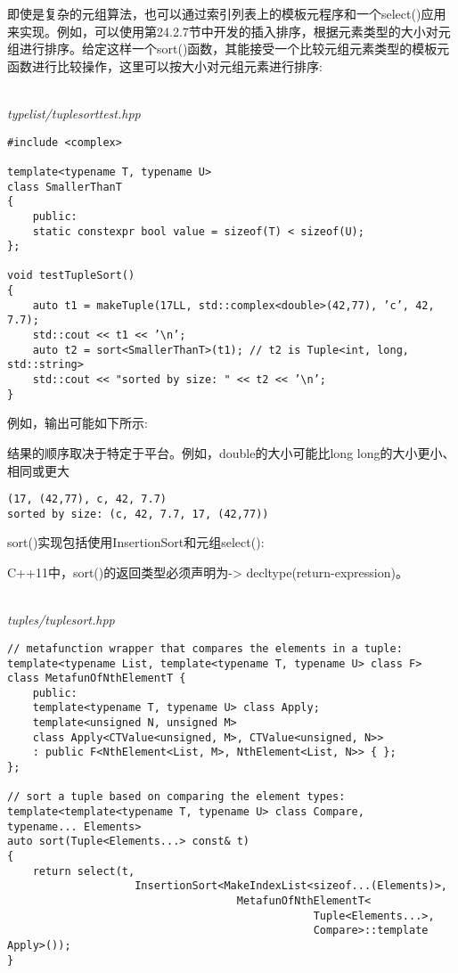 即使是复杂的元组算法，也可以通过索引列表上的模板元程序和一个select()应用来实现。例如，可以使用第24.2.7节中开发的插入排序，根据元素类型的大小对元组进行排序。给定这样一个sort()函数，其能接受一个比较元组元素类型的模板元函数进行比较操作，这里可以按大小对元组元素进行排序:

\hspace*{\fill} \\ %
\noindent
\textit{typelist/tuplesorttest.hpp}
\begin{lstlisting}[style=styleCXX]
#include <complex>

template<typename T, typename U>
class SmallerThanT
{
	public:
	static constexpr bool value = sizeof(T) < sizeof(U);
};

void testTupleSort()
{
	auto t1 = makeTuple(17LL, std::complex<double>(42,77), ’c’, 42, 7.7);
	std::cout << t1 << ’\n’;
	auto t2 = sort<SmallerThanT>(t1); // t2 is Tuple<int, long, std::string>
	std::cout << "sorted by size: " << t2 << ’\n’;
}
\end{lstlisting}

例如，输出可能如下所示:

\begin{tcolorbox}[colback=webgreen!5!white,colframe=webgreen!75!black]
\hspace*{0.75cm}结果的顺序取决于特定于平台。例如，double的大小可能比long long的大小更小、相同或更大
\end{tcolorbox}

\begin{lstlisting}[style=styleCXX]
(17, (42,77), c, 42, 7.7)
sorted by size: (c, 42, 7.7, 17, (42,77))
\end{lstlisting}

sort()实现包括使用InsertionSort和元组select():

\begin{tcolorbox}[colback=webgreen!5!white,colframe=webgreen!75!black]
\hspace*{0.75cm}C++11中，sort()的返回类型必须声明为-> decltype(return-expression)。
\end{tcolorbox}

\hspace*{\fill} \\ %
\noindent
\textit{tuples/tuplesort.hpp}
\begin{lstlisting}[style=styleCXX]
// metafunction wrapper that compares the elements in a tuple:
template<typename List, template<typename T, typename U> class F>
class MetafunOfNthElementT {
	public:
	template<typename T, typename U> class Apply;
	template<unsigned N, unsigned M>
	class Apply<CTValue<unsigned, M>, CTValue<unsigned, N>>
	: public F<NthElement<List, M>, NthElement<List, N>> { };
};

// sort a tuple based on comparing the element types:
template<template<typename T, typename U> class Compare,
typename... Elements>
auto sort(Tuple<Elements...> const& t)
{
	return select(t,
					InsertionSort<MakeIndexList<sizeof...(Elements)>,
									MetafunOfNthElementT<
												Tuple<Elements...>,
												Compare>::template Apply>());
}
\end{lstlisting}

